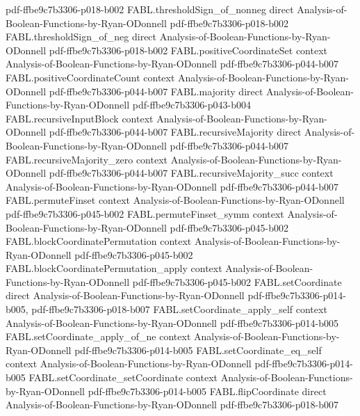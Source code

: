 \begin{theorem}
  {pdf-ffbe9c7b3306-p018-b002}
\proofstep
  {FABL.thresholdSign_of_nonneg}
  {direct}
  {Analysis-of-Boolean-Functions-by-Ryan-ODonnell}
  {pdf-ffbe9c7b3306-p018-b002}
\proofstep
  {FABL.thresholdSign_of_neg}
  {direct}
  {Analysis-of-Boolean-Functions-by-Ryan-ODonnell}
  {pdf-ffbe9c7b3306-p018-b002}
\proofstep
  {FABL.positiveCoordinateSet}
  {context}
  {Analysis-of-Boolean-Functions-by-Ryan-ODonnell}
  {pdf-ffbe9c7b3306-p044-b007}
\proofstep
  {FABL.positiveCoordinateCount}
  {context}
  {Analysis-of-Boolean-Functions-by-Ryan-ODonnell}
  {pdf-ffbe9c7b3306-p044-b007}
\proofstep
  {FABL.majority}
  {direct}
  {Analysis-of-Boolean-Functions-by-Ryan-ODonnell}
  {pdf-ffbe9c7b3306-p043-b004}
\proofstep
  {FABL.recursiveInputBlock}
  {context}
  {Analysis-of-Boolean-Functions-by-Ryan-ODonnell}
  {pdf-ffbe9c7b3306-p044-b007}
\proofstep
  {FABL.recursiveMajority}
  {direct}
  {Analysis-of-Boolean-Functions-by-Ryan-ODonnell}
  {pdf-ffbe9c7b3306-p044-b007}
\proofstep
  {FABL.recursiveMajority_zero}
  {context}
  {Analysis-of-Boolean-Functions-by-Ryan-ODonnell}
  {pdf-ffbe9c7b3306-p044-b007}
\proofstep
  {FABL.recursiveMajority_succ}
  {context}
  {Analysis-of-Boolean-Functions-by-Ryan-ODonnell}
  {pdf-ffbe9c7b3306-p044-b007}
\proofstep
  {FABL.permuteFinset}
  {context}
  {Analysis-of-Boolean-Functions-by-Ryan-ODonnell}
  {pdf-ffbe9c7b3306-p045-b002}
\proofstep
  {FABL.permuteFinset_symm}
  {context}
  {Analysis-of-Boolean-Functions-by-Ryan-ODonnell}
  {pdf-ffbe9c7b3306-p045-b002}
\proofstep
  {FABL.blockCoordinatePermutation}
  {context}
  {Analysis-of-Boolean-Functions-by-Ryan-ODonnell}
  {pdf-ffbe9c7b3306-p045-b002}
\proofstep
  {FABL.blockCoordinatePermutation_apply}
  {context}
  {Analysis-of-Boolean-Functions-by-Ryan-ODonnell}
  {pdf-ffbe9c7b3306-p045-b002}
\proofstep
  {FABL.setCoordinate}
  {direct}
  {Analysis-of-Boolean-Functions-by-Ryan-ODonnell}
  {pdf-ffbe9c7b3306-p014-b005,
    pdf-ffbe9c7b3306-p018-b007}
\proofstep
  {FABL.setCoordinate_apply_self}
  {context}
  {Analysis-of-Boolean-Functions-by-Ryan-ODonnell}
  {pdf-ffbe9c7b3306-p014-b005}
\proofstep
  {FABL.setCoordinate_apply_of_ne}
  {context}
  {Analysis-of-Boolean-Functions-by-Ryan-ODonnell}
  {pdf-ffbe9c7b3306-p014-b005}
\proofstep
  {FABL.setCoordinate_eq_self}
  {context}
  {Analysis-of-Boolean-Functions-by-Ryan-ODonnell}
  {pdf-ffbe9c7b3306-p014-b005}
\proofstep
  {FABL.setCoordinate_setCoordinate}
  {context}
  {Analysis-of-Boolean-Functions-by-Ryan-ODonnell}
  {pdf-ffbe9c7b3306-p014-b005}
\proofstep
  {FABL.flipCoordinate}
  {direct}
  {Analysis-of-Boolean-Functions-by-Ryan-ODonnell}
  {pdf-ffbe9c7b3306-p018-b007}

\end{theorem}
